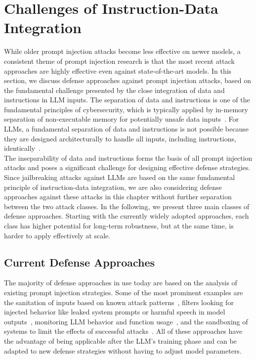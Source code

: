 \section{Challenges of Instruction-Data Integration} \label{sec:instruction_data}

While older prompt injection attacks become less effective on newer models, a consistent theme of prompt injection research is that the most recent attack approaches are highly effective even against state-of-the-art models.
In this section, we discuss defense approaches against prompt injection attacks, based on the fundamental challenge presented by the close integration of data and instructions in LLM inputs.
The separation of data and instructions is one of the fundamental principles of cybersecurity, which is typically applied by in-memory separation of non-executable memory for potentially unsafe data inputs~\cite{owasp_a05_nodate}.
For LLMs, a fundamental separation of data and instructions is not possible because they are designed architecturally to handle all inputs, including instructions, identically~\cite{kamath_prompt-based_2024}.\\

The inseparability of data and instructions forms the basis of all prompt injection attacks and poses a significant challenge for designing effective defense strategies.
Since jailbreaking attacks against LLMs are based on the same fundamental principle of instruction-data integration, we are also considering defense approaches against these attacks in this chapter without further separation between the two attack classes.
In the following, we present three main classes of defense approaches.
Starting with the currently widely adopted approaches, each class has higher potential for long-term robustness, but at the same time, is harder to apply effectively at scale.

\subsection{Current Defense Approaches} \label{sec:current_defenses}
The majority of defense approaches in use today are based on the analysis of existing prompt injection strategies.
Some of the most prominent examples are the sanitation of inputs based on known attack patterns~\cite{owasp_prompt_nodate}, filters looking for injected behavior like leaked system prompts or harmful speech in model outputs~\cite{hui_pleak_2024, ji_controlling_2023}, monitoring LLM behavior and function usage~\cite{owasp_prompt_nodate}, and the sandboxing of systems to limit the effects of successful attacks~\cite{debenedetti_defeating_2025}.
All of these approaches have the advantage of being applicable after the LLM's training phase and can be adapted to new defense strategies without having to adjust model parameters.\\

